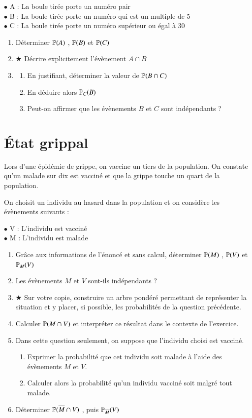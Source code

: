 \documentclass[oneside,12pt]{exam}          %
\begin{document}
$\bullet$ A : \og La boule tirée porte un numéro pair \fg \\
$\bullet$ B : \og La boule tirée porte un numéro qui est un multiple de 5\fg \\
$\bullet$ C : \og La boule tirée porte un numéro supérieur ou égal à $30$ \fg
\begin{enumerate}[itemsep = 0pt]
	\item Déterminer ${\mathbb P}(A)$ , ${\mathbb P}(B)$ et ${\mathbb P}(C)$
	\item $\bigstar$ Décrire explicitement l'évènement $A \cap B$
	\item \begin{enumerate}
		\item En justifiant, déterminer la valeur de ${\mathbb P}(B \cap C)$
		\item En déduire alors ${\mathbb P}_C(B)$
		\item Peut-on affirmer que les évènements $B$ et $C$ sont indépendants ?
	\end{enumerate}
\end{enumerate}



\section{État grippal}
Lors d'une épidémie de grippe, on vaccine un tiers de la population. On constate qu'un malade sur dix est vacciné et que la grippe touche un quart de la population.

On choisit un individu au hasard dans la population et on considère les évènements suivants :

$\bullet$ V : \og L'individu est vacciné \fg \\
$\bullet$ M : \og L'individu est malade \fg 
\begin{enumerate}[align = left]
	\item Grâce aux informations de l'énoncé et sans calcul, déterminer ${\mathbb P}(M)$ , ${\mathbb P}(V)$ et ${\mathbb P}_M(V)$
	\item Les évènements $M$ et $V$ sont-ils indépendants ?
	\item $\bigstar$ Sur votre copie, construire un arbre pondéré permettant de représenter la situation et y placer, si possible, les probabilités de la question précédente.
	\item Calculer ${\mathbb P}(M \cap V)$ et interpréter ce résultat dans le contexte de l'exercice.
	\item Dans cette question seulement, on suppose que l'individu choisi est vacciné.
	\begin{enumerate}
		\item Exprimer la probabilité que cet individu soit malade à l'aide des évènements $M$ et $V$.
		\item Calculer alors la probabilité qu'un individu vacciné soit malgré tout malade.
	\end{enumerate}
	\item[\underline{Question bonus} :] Déterminer ${\mathbb P}({\overline{M}} \cap V)$ , puis ${\mathbb P}_{{\overline{M}}}(V)$
\end{enumerate}
\end{document}
